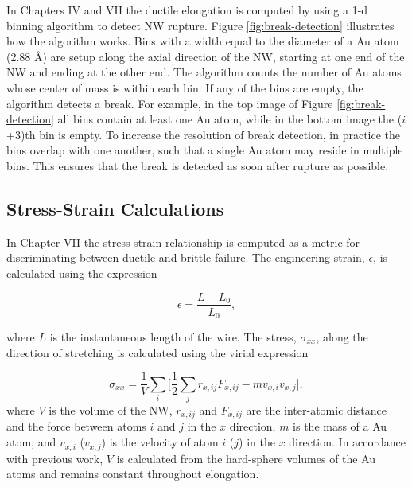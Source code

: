 \documentclass[10pt]{report}  %
\newcommand\findent{\hspace*{\parindent}}
\begin{document}
\findent In Chapters IV and VII the ductile elongation is computed by using a 1-d binning algorithm to detect NW rupture. Figure \ref{fig:break-detection} illustrates how the algorithm works. Bins with a width equal to the diameter of a Au atom (2.88 \AA) are setup along the axial direction of the NW, starting at one end of the NW and ending at the other end. The algorithm counts the number of Au atoms whose center of mass is within each bin. If any of the bins are empty, the algorithm detects a break. For example, in the top image of Figure \ref{fig:break-detection} all bins contain at least one Au atom, while in the bottom image the ($i$+3)th bin is empty. To increase the resolution of break detection, in practice the bins overlap with one another, such that a single Au atom may reside in multiple bins. This ensures that the break is detected as soon after rupture as possible. 

\subsection{Stress-Strain Calculations}

\findent In Chapter VII the stress-strain relationship is computed as a metric for discriminating between ductile and brittle failure. The engineering strain, $\epsilon$, is calculated using the expression

\begin{equation}
\epsilon = \frac{L - L_{0}}{L_{0}},\label{strain}
\end{equation} 

\noindent where $L$ is the instantaneous length of the wire. The stress, $\sigma_{xx}$, along the direction of stretching is calculated using the virial expression \cite{Zimmerman:2004,Subramaniyan:2008}

\begin{equation}\sigma_{xx} =\frac{1}{V}\sum_{i}\Big[\frac{1}{2}\sum_{j}r_{x,ij}F_{x,ij}-mv_{x,i}v_{x,j}\Big],\label{stress}
\end{equation} where $V$ is the volume of the NW, $r_{x,ij}$ and $F_{x,ij}$ are the inter-atomic distance and the force between atoms $i$ and $j$ in the $x$ direction, $m$ is the mass of a Au atom, and $v_{x,i}$ ($v_{x,j}$) is the velocity of atom $i$ ($j$) in the $x$ direction. In accordance with previous work,\cite{Koh:2005} $V$ is calculated from the hard-sphere volumes of the Au atoms and remains constant throughout elongation.
\end{document}
